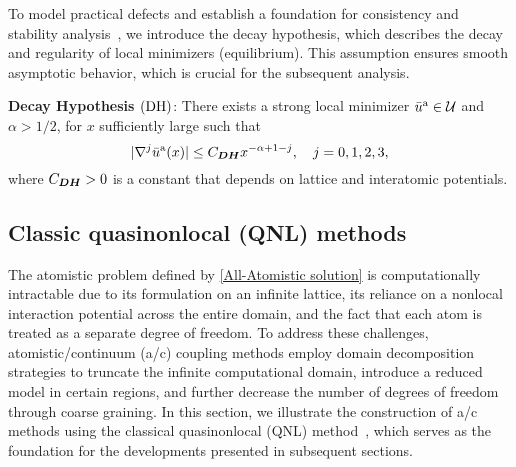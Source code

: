 	To model practical defects and establish a foundation for consistency and stability analysis~\cite{2016_EV_CO_AS_Boundary_Conditions_for_Crystal_Lattice_ARMA}, we introduce the decay hypothesis, which describes the decay and regularity of local minimizers (equilibrium). This assumption ensures smooth asymptotic behavior, which is crucial for the subsequent analysis.
	
	
	\textbf{Decay Hypothesis $\textbf{\rm (DH)}$}: There exists a strong local minimizer $\bar{u}^{\rm a} \in \mathcal{U}$ and $\alpha > 1/2$, for $x$ sufficiently large such that
	\begin{equation}\label{Decay Hypothesis}
		\vert \nabla^{j} \bar{u}^{\rm a}(x) \vert \le C_{\bm{DH}} x^{-\alpha+1-j}, \quad j = 0,1,2,3,
	\end{equation}
	where $C_{\bm{DH}}>0$ is a constant that depends on lattice and interatomic potentials. 
	
	
	\subsection{Classic quasinonlocal (QNL) methods}
	\label{sec: introduction_qnl}
	
	The atomistic problem defined by \eqref{All-Atomistic solution} is computationally intractable due to its formulation on an infinite lattice, its reliance on a nonlocal interaction potential across the entire domain, and the fact that each atom is treated as a separate degree of freedom. To address these challenges, atomistic/continuum (a/c) coupling methods employ domain decomposition strategies to truncate the infinite computational domain, introduce a reduced model in certain regions, and further decrease the number of degrees of freedom through coarse graining. In this section, we illustrate the construction of a/c methods using the classical quasinonlocal (QNL) method~\cite{2011_CO_1D_QNL_MATHCOMP}, which serves as the foundation for the developments presented in subsequent sections.
	
